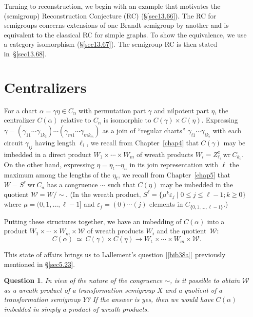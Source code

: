 \documentclass{surv-l}
\numberwithin{equation}{section}
\numberwithin{table}{section}
\numberwithin{figure}{section}
\theoremstyle{plain}
\newtheorem{question}[equation]{Question}
\theoremstyle{definition}
\begin{document}
Turning to reconstruction, we begin with an example that motivates
the (semigroup) Reconstruction Conjecture (RC) (\S\ref{sec13.66}).
The RC for semigroups concerns extensions of one Brandt semigroup
by another and is equivalent to the classical RC for simple
graphs. To show the equivalence, we use a category isomorphism
(\S\ref{sec13.67}). The semigroup RC is then stated
in~\S\ref{sec13.68}.

\setcounter{section}{61}
\section{Centralizers}\label{sec13.62}

For a chart $\alpha=\gamma\eta\in C_{n}$ with permutation part
$\gamma$ and nilpotent part $\eta$, the centralizer $C(\alpha)$
relative to $C_{n}$ is isomorphic to $C(\gamma)\times C(\eta)$.
Expressing
$\gamma=(\gamma_{11}\cdots\gamma_{1k_{1}})\cdots(\gamma_{m1}\cdots\gamma_{mk_{m}})$
as a join of ``regular charts'' $\gamma_{i1}\cdots\gamma_{ik_{i}}$
with each circuit $\gamma_{ij}$ having length $\ell_{i}$, we
recall from Chapter~\ref{chap4} that $C(\gamma)$ may be imbedded in a direct
product $W_{1}\times\cdots\times W_{m}$ of wreath products
$W_{i}=Z_{\ell_{i}}^{z}\ \mathrm{wr}\ C_{k_{i}}$. On the other
hand, expressing $\eta=\eta_{1}\cdots\eta_{u}$ in its join
representation with $\ell$ the maximum among the lengths of the
$\eta_{t}$, we recall from Chapter~\ref{chap5} that $W=S^{\ell}\
\mathrm{wr}\ C_{u}$ has a congruence $\sim$ such that $C(\eta)$
may be imbedded in the quotient $\mathcal{W}=W/\sim$. (In the
wreath product, $S^{\ell}= \{\mu^{k}\varepsilon_{j}\mid 0\leq
j\leq\ell-1;k\geq 0\}$ where $\mu=(0,1,\ldots, \ell-1]$ and
$\varepsilon_{j}=(0)\cdots(j)$ elements in
$C_{\{0,1,\ldots,\ell-1\}}.$)

Putting these structures together, we have an imbedding of
$C(\alpha)$ into a product $W_{1}\times\cdots\times
W_{m}\times \mathcal{W}$ of wreath products $W_{i}$ and the
quotient~$\mathcal{W}$:
\[
C(\alpha)\ \simeq\  C(\gamma)\times C(\eta)\longrightarrow
W_{1}\times\cdots\times W_{m}\times \mathcal{W}.
\]

This state of affairs brings us to Lallement's
question
[\ref{bib38a}] previously mentioned in
\S\ref{sec5.23}.

\begin{question}\label{ques13.62.1}
In view of the nature of the congruence $\sim$, is it possible
to obtain $\mathcal{W}$ as a wreath product of a
transformation semigroup $X$ and a quotient of a
transformation semigroup $Y$? If the answer is yes, then we
would have $C(\alpha)$ imbedded in simply a product of wreath
products.
\end{question}
\end{document}

